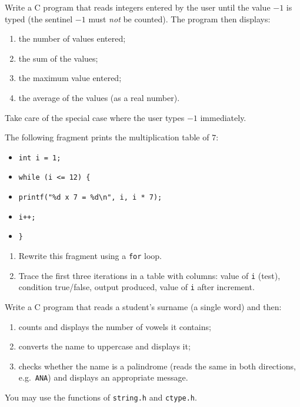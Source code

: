 \documentclass[11pt]{article}
\begin{document}
\begin{exercice}
Write a C program that reads integers entered by the user until the value $-1$ is typed (the sentinel $-1$ must \emph{not} be counted). The program then displays:
\begin{enumerate}
\item the number of values entered;
\item the sum of the values;
\item the maximum value entered;
\item the average of the values (as a real number).
\end{enumerate}
Take care of the special case where the user types $-1$ immediately.
\end{exercice}

\begin{exercice}
The following fragment prints the multiplication table of $7$:
\begin{itemize}
\item \texttt{int i = 1;}
\item \texttt{while (i <= 12) \{}
\item \texttt{\quad printf("\%d x 7 = \%d\textbackslash n", i, i * 7);}
\item \texttt{\quad i++;}
\item \texttt{\}}
\end{itemize}
\begin{enumerate}
\item Rewrite this fragment using a \texttt{for} loop.
\item Trace the first three iterations in a table with columns: value of \texttt{i} (test), condition true/false, output produced, value of \texttt{i} after increment.
\end{enumerate}
\end{exercice}

\begin{exercice}
Write a C program that reads a student's surname (a single word) and then:
\begin{enumerate}
\item counts and displays the number of vowels it contains;
\item converts the name to uppercase and displays it;
\item checks whether the name is a palindrome (reads the same in both directions, e.g.\ \texttt{ANA}) and displays an appropriate message.
\end{enumerate}
You may use the functions of \texttt{string.h} and \texttt{ctype.h}.
\end{exercice}
\end{document}
